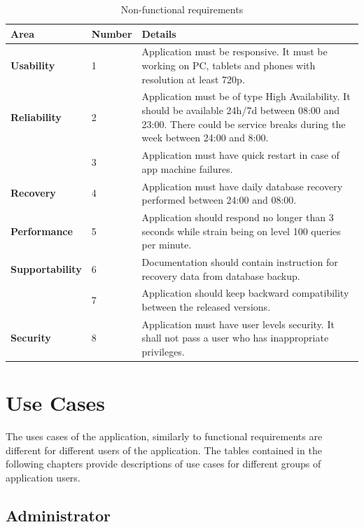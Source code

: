 \documentclass[a4paper,11pt,twoside]{report}
\theoremstyle{definition}
\begin{document}
\begin{table}[!htbp]
\caption[Non-functional Requirements]{Non-functional requirements}
\label{requirements}
\centering
\begin{tabular}{|p{3cm}|p{2cm}|p{11cm}|}
\hline
Area & Number & Details \\ \hline
\textbf{Usability} & 1 & Application must be responsive. It must be working on PC, tablets and phones with resolution at least 720p.\\  \hline
\textbf{Reliability} & 2 & Application must be of type High Availability. It should be available 24h/7d between 08:00 and 23:00. There could be service breaks during the week between 24:00 and 8:00. \\  \cline{2-3}
\texttt{} & 3 & Application must have quick restart in case of app machine failures. \\ \hline
\textbf{Recovery} & 4 & Application must have daily database recovery performed between 24:00 and 08:00. \\ \hline
\textbf{Performance} & 5 & Application should respond no longer than 3 seconds while strain being on level 100 queries per minute. \\ \hline
\textbf{Supportability} & 6 & Documentation should contain instruction for recovery data from database backup.  \\ \cline{2-3}
\texttt{} & 7 & Application should keep backward compatibility between the released versions. \\ \hline
\textbf{Security} & 8 & Application must have user levels security. It shall not pass a user who has inappropriate privileges. \\ \hline


\end{tabular}
\end{table}



\section{Use Cases}

The uses cases of the application, similarly to functional requirements are different for different users of the application. The tables contained in the following chapters provide descriptions of use cases for different groups of application users.
\pagebreak
\subsection{Administrator}
\end{document}
